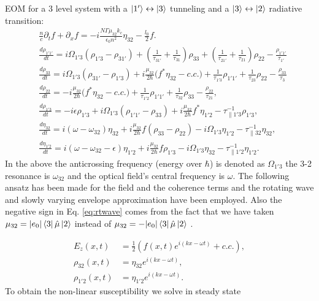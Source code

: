 \documentclass[10pt,letterpaper]{article}
\begin{document}
	EOM for a 3 level system with a $\Ket{1'} \leftrightarrow \Ket{3}$ tunneling and a $\Ket{3}\leftrightarrow\Ket{2}$ radiative transition:
	\begin{subequations}
		\label{eq:threelevelmodel}
		\begin{align}
		&\frac{n}{c}\partial_t f + \partial_{x}f = -i\frac{N \Gamma \mu_{32} k_c}{\epsilon_0 n^2} \eta_{32} - \frac{l_0}{2} f \label{eq:rtwave} .\\
		&\frac{d \rho_{1'1'}}{d t} = i\Omega_{1'3} (\rho_{1'3} - \rho_{31'}) + (\frac{1}{\tau_{31'}} + \frac{1}{\tau_{31}})\rho_{33} 
		+ (\frac{1}{\tau_{21'}} + \frac{1}{\tau_{21}})\rho_{22} - \frac{\rho_{1'1'}}{\tau_{1'}} \\
		&\frac{d \rho_{33}}{d t} = i\Omega_{1'3} (\rho_{31'} - \rho_{1'3}) + i\frac{\mu_{32}}{2\hbar} \big (f^*\eta_{32}- c.c. \big )+ \frac{1}{\tau_{1'3}}\rho_{1'1'} +  \frac{1}{\tau_{23}}\rho_{22} - \frac{\rho_{33}}{\tau_{3}}  \\
		&\frac{d \rho_{22}}{d t}  = -i\frac{\mu_{32}}{2\hbar} \big (f^*\eta_{32} - c.c. \big ) + \frac{1}{\tau_{1'2}}\rho_{1'1'}  +  \frac{1}{\tau_{32}}\rho_{33} - \frac{\rho_{22}}{\tau_{21}} , \\
		&\frac{d \rho_{1'3}}{d t}  = -i\epsilon\rho_{1'3} +i \Omega_{1'3}(\rho_{1'1'} - \rho_{33}) +i\frac{\mu_{32}}{2 \hbar}f^*\eta_{1'2}-\tau_{\parallel 1'3}^{-1} \rho_{1'3},  \\
		&\frac{d \eta_{32}}{d t}   = i(\omega - \omega_{32})\eta_{32} +i \frac{\mu_{32}}{2\hbar}f(\rho_{33}-\rho_{22}) - i\Omega_{1'3}\eta_{1'2} - \tau_{\parallel 32}^{-1}\eta_{32}, \\
		&\frac{d \eta_{1'2}}{d t}  = i(\omega - \omega_{32}-\epsilon)\eta_{1'2} +i \frac{\mu_{32}}{2\hbar}f\rho_{1'3} - i\Omega_{1'3}\eta_{32} - \tau_{\parallel 1'2}^{-1}\eta_{1'2}.
		\end{align}
	\end{subequations}
	In the above the anticrossing frequency (energy over $\hbar$) is denoted as $\Omega_{1'3}$ the 3-2 resonance is $\omega_{32}$ and the optical field's central frequency is $\omega$. The following ansatz has been made for the field and the coherence terms and the rotating wave and slowly varying envelope approximation have been employed. Also the negative sign in Eq. \ref{eq:rtwave} comes from the fact that we have taken $\mu_{32} = |e_0|\Bra{3}\hat{\mu}\Ket{2}$ instead of $\mu_{32} = -|e_0|\Bra{3}\hat{\mu}\Ket{2}$ .
	
	\begin{align}
	E_z(x,t) &= \frac{1}{2}\left( f(x,t) e^{i(kx-\omega t)} + c.c. \right ), \\ 
	\rho_{32}(x,t) &= \eta_{32}e^{i(kx-\omega t)}, \\ 
	\rho_{1'2}(x,t) &= \eta_{1'2}e^{i(kx-\omega t)}.
	\end{align}
	To obtain the non-linear susceptibility we solve in steady state\\
	
\end{document}
